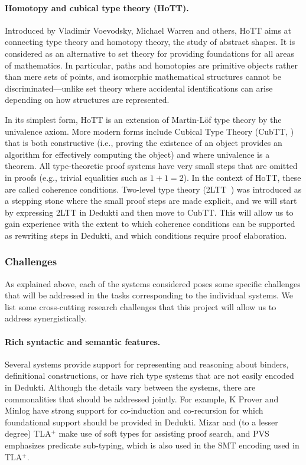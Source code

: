 \paragraph*{Homotopy and cubical type theory (HoTT).}
Introduced by Vladimir Voevodsky, Michael Warren and others, HoTT aims at
connecting type theory and homotopy theory, the study of abstract shapes. It is
considered as an alternative to set theory for providing foundations for all
areas of mathematics. In particular, paths and homotopies are primitive objects
rather than mere sets of points, and isomorphic mathematical structures cannot
be discriminated---unlike set theory where accidental identifications can arise
depending on how structures are represented.

In its simplest form, HoTT is an extension of Martin-L\"of type theory by the
univalence axiom. More modern forms include Cubical Type Theory (CubTT,
\cite{cohen:cubical}) that is both constructive (i.e., proving the existence of
an object provides an algorithm for effectively computing the object) and where
univalence is a theorem. All type-theoretic proof systems have very small steps
that are omitted in proofs (e.g., trivial equalities such as $1+1=2$). In the
context of HoTT, these are called coherence conditions. Two-level type theory
(2LTT~\cite{annenkov:two-level}) was introduced as a stepping stone where the
small proof steps are made explicit, and we will start by expressing 2LTT in
Dedukti and then move to CubTT. This will allow us to gain experience with
the extent to which coherence conditions can be supported as rewriting steps in
Dedukti, and which conditions require proof elaboration.

\subsubsection*{Challenges}

As explained above, each of the systems considered poses some specific
challenges that will be addressed in the tasks corresponding to the
individual systems. We list some cross-cutting research challenges
that this project will allow us to address synergistically.

\paragraph*{Rich syntactic and semantic features.}
Several systems provide support for representing and reasoning about
binders, definitional constructions, or have rich type systems that
are not easily encoded in Dedukti.  Although the details vary between the systems,
there are commonalities that should be addressed jointly. For example,
K Prover and Minlog have strong support for co-induction and co-recursion
for which foundational support should be provided in Dedukti. Mizar
and (to a lesser degree) TLA$^+$ make use of soft types for assisting
proof search, and PVS emphasizes predicate sub-typing, which is also
used in the SMT encoding used in TLA$^+$.

